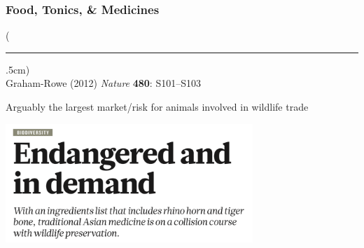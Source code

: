 \documentclass[10pt]{beamer}
\newenvironment{reference}[2]{%
	\begin{textblock*}{\textwidth}(#1,#2)
		\tiny\bgroup\color{gray}}{\egroup\end{textblock*}}
\begin{document}
\begin{frame}[t]
\frametitle{Food, Tonics, \& Medicines}
\vspace{0.5cm}
	
	\begin{reference}{4mm}{92mm}
		\rule{1.5cm}{0.25pt}\\
		Graham-Rowe (2012) \emph{Nature} \textbf{480}: S101--S103
	\end{reference}
	
	Arguably the largest market/risk for \textcolor{myblue}{animals} involved in wildlife trade\\
	
	\vspace{0.25cm}
	
	\begin{center}
		\includegraphics[width=0.7\textwidth]{figures/asian_medicine.png}
	\end{center}
\end{frame}
\end{document}
